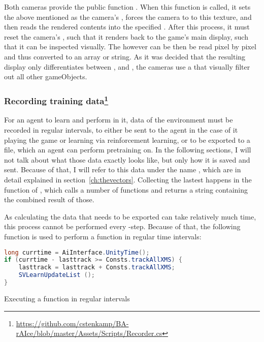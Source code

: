Both cameras provide the public function . When this function is called, it sets the above mentioned  as the camera's , forces the camera to  to this texture, and then reads the rendered contents into the specified . After this process, it must reset the camera's , such that it renders back to the game's main display, such that it can be inspected visually. The  however can be then be read pixel by pixel and thus converted to an array or string. As it was decided that the resulting display only differentiates between ,  and , the cameras use a  that visually filter out all other gameObjects.

\subsubsection{Recording training data\footnote{\url{https://github.com/cstenkamp/BA-rAIce/blob/master/Assets/Scripts/Recorder.cs}}}

\label{sec:exportdata}

For an agent to learn and perform in it, data of the environment must be recorded in regular intervals, to either be sent to the agent in the case of it playing the game or learning via reinforcement learning, or to be exported to a file, which an agent can perform pretraining on. In the following sections, I will not talk about what those data exactly looks like, but only how it is saved and sent. Because of that, I will refer to this data under the name , which are in detail explained in section~\ref{ch:thevectors}. Collecting the lastest  happens in the function  of , which calls a number of functions and returns a string containing the combined result of those.

As calculating the data that needs to be exported can take relatively much time, this process cannot be performed every -step. Because of that, the following function is used to perform a function in regular time intervals:
\begin{algorithm}[h]
\begin{lstlisting}[language=C#, style=CSharp, frame=none]
long currtime = AiInterface.UnityTime();
if (currtime - lasttrack >= Consts.trackAllXMS) {
	lasttrack = lasttrack + Consts.trackAllXMS; 
	SVLearnUpdateList ();
}
\end{lstlisting}%
\caption{Executing a function in regular intervals}
\label{alg:everyxseconds}
\end{algorithm}

